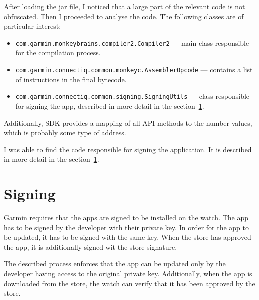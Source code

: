After loading the jar file, I noticed that a large part of the relevant code is not obfuscated.
Then I proceeded to analyse the code.
The following classes are of particular interest:
\begin{itemize}
    \item \texttt{com.garmin.monkeybrains.compiler2.Compiler2} — main class responsible for the compilation process.
    \item \texttt{com.garmin.connectiq.common.monkeyc.AssemblerOpcode} — contains a list of instructions in the final bytecode.
    \item \texttt{com.garmin.connectiq.common.signing.SigningUtils} — class responsible for signing the app, described in more detail in the section~\ref{subsec:signing}.
\end{itemize}
Additionally, SDK provides a mapping of all API methods to the number values, which is probably some type of address.

I was able to find the code responsible for signing the application.
It is described in more detail in the section~\ref{subsec:signing}.

\section{Signing} \label{subsec:signing}
Garmin requires that the apps are signed to be installed on the watch\cite{garmin-signing}.
The app has to be signed by the developer with their private key.
In order for the app to be updated, it has to be signed with the same key.
When the store has approved the app, it is additionally signed wit the store signature.

The described process enforces that the app can be updated only by the developer having access to the original private key.
Additionally, when the app is downloaded from the store, the watch can verify that it has been approved by the store.

